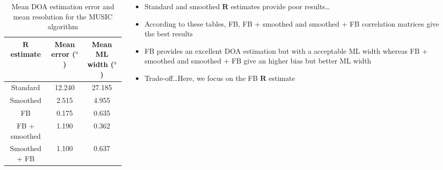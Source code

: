\documentclass[UKenglish,8pt,aspectratio=1610]{beamer}
\begin{document}
\begin{frame}
\begin{columns}
	\begin{column}{0.5\textwidth}
	\begin{table}
		\begin{tabular}{ccc}
			\hline
			$\mathbf{R}$ estimate&Mean error ($\si{\degree}$)&Mean ML width ($\si{\degree}$)\\
			\hline
			\hline
			Standard&\cellcolor{red!25}12.240&\cellcolor{red!25}27.185\\
			Smoothed&\cellcolor{red!25}2.515&\cellcolor{red!25}4.955\\
			FB&\cellcolor{green!25}0.175&\cellcolor{green!25}0.635\\
			FB + smoothed&\cellcolor{orange!25}1.190&\cellcolor{green!25}0.362\\
			Smoothed + FB&\cellcolor{orange!25}1.100&\cellcolor{green!25}0.637\\
			\hline
		\end{tabular}
		\centering
		\caption{Mean DOA estimation error and mean resolution for the MUSIC algorithm}
	\end{table}
	\end{column}
	\begin{column}{0.5\textwidth}
		\begin{itemize}
			\item Standard and smoothed $\mathbf{R}$ estimates provide poor results\dots
			\item According to these tables, FB, FB + smoothed and smoothed + FB correlation matrices give the best results
			\item FB provides an excellent DOA estimation but with a acceptable ML width whereas FB + smoothed and smoothed + FB give an higher bias but better ML width
			\item Trade-off\dots Here, we focus on the FB $\mathbf{R}$ estimate
		\end{itemize}
	\end{column}
\end{columns}

\end{frame}
\end{document}
